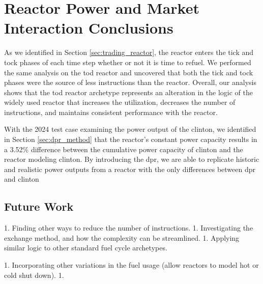\section{Reactor Power and Market Interaction Conclusions}

As we identified in Section \ref{sec:trading_reactor}, the \cycamore reactor enters the tick and tock phases of each time step whether or not it is time to refuel. We performed the same analysis on the \gls{tod} reactor and uncovered that both the tick and tock phases were the source of less instructions than the \cycamore reactor. Overall, our analysis shows that the \gls{tod} reactor archetype represents an alteration in the logic of the widely used \cycamore reactor that increases the utilization, decreases the number of instructions, and maintains consistent performance with the \cycamore reactor.

With the 2024 test case examining the power output of the \gls{clinton}, we identified in Section \ref{sec:dpr_method} that the \cycamore reactor's constant power capacity results in a 3.52\% difference between the cumulative power capacity of \gls{clinton} and the \cycamore reactor modeling \gls{clinton}. By introducing the \gls{dpr}, we are able to replicate historic and realistic power outputs from a reactor with the only differences between \gls{dpr} and \gls{clinton} 

\subsection{Future Work}
\label{sec:time_future_work}

1. Finding other ways to reduce the number of instructions.
1. Investigating the exchange method, and how the complexity can be streamlined.
1. Applying similar logic to other standard fuel cycle archetypes.

1. Incorporating other variations in the fuel usage (allow reactors to model hot or cold shut down).
1.